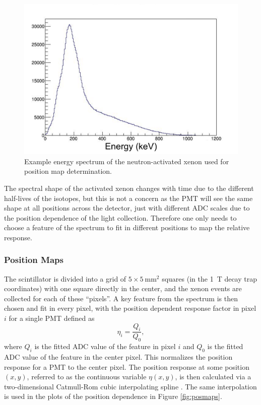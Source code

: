 \begin{figure}[h] 
\centering
\includegraphics[scale=.5]{4-UCNACalibrations/xenonSpectrum.pdf}
\caption{Example energy spectrum of the neutron-activated xenon used for position map determination. }
\label{fig:xenonSpectrum}
\end{figure}

The spectral shape of the activated xenon changes with time due to the different half-lives
of the isotopes, but this is not a concern as the PMT will see the same shape at all positions
across the detector, just with different ADC scales due to the position dependence of the light
collection. Therefore one only needs to choose a feature of the spectrum to fit in different
positions to map the relative response.

\subsubsection{Position Maps}

The scintillator is divided into a grid of $5\times5\mathrm{~mm}^2$ squares (in the 1~T
decay trap coordinates) with one square directly in the center,
and the xenon events are collected for each of these ``pixels''. A key feature
from the spectrum is then chosen and fit in every pixel, with the position dependent response
factor in pixel $i$ for a single PMT defined as
%
\begin{equation}
  \eta_i = \frac{Q_i}{Q_0},
\end{equation}
%
where $Q_i$ is the fitted ADC value of the feature in pixel $i$ and $Q_0$ is the fitted ADC value of the
feature in the center pixel. This normalizes the position response for a PMT to the center pixel. The
position response at some position $(x,y)$, referred to as the continuous variable $\eta(x,y)$,
is then calculated via a two-dimensional Catmull-Rom
cubic interpolating spline \cite{catmull1974}. The same interpolation is used in the plots of the
position dependence in Figure \ref{fig:posmaps}.


